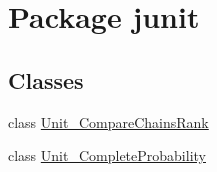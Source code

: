 \hypertarget{namespacejunit}{}\section{Package junit}
\label{namespacejunit}
\subsection*{Classes}
\begin{DoxyCompactItemize}
\item 
class \hyperlink{classjunit_1_1_unit___compare_chains_rank}{Unit\+\_\+\+Compare\+Chains\+Rank}
\item 
class \hyperlink{classjunit_1_1_unit___complete_probability}{Unit\+\_\+\+Complete\+Probability}
\end{DoxyCompactItemize}
